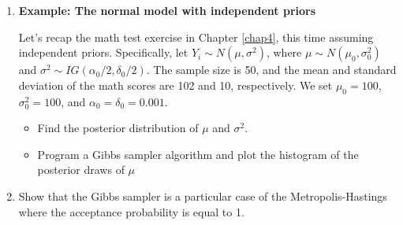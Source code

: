 \begin{enumerate}
	\item \textbf{Example: The normal model with independent priors}
	
	Let's recap the math test exercise in Chapter \ref{chap4}, this time assuming independent priors. Specifically, let $Y_i \sim N(\mu, \sigma^2)$, where $\mu \sim N(\mu_0, \sigma_0^2)$ and $\sigma^2 \sim IG(\alpha_0 / 2, \delta_0 / 2)$. The sample size is 50, and the mean and standard deviation of the math scores are 102 and 10, respectively. We set $\mu_0 = 100$, $\sigma_0^2 = 100$, and $\alpha_0 = \delta_0 = 0.001$.
	
	\begin{itemize}
		\item Find the posterior distribution of $\mu$ and $\sigma^2$.
		\item Program a Gibbs sampler algorithm and plot the histogram of the posterior draws of $\mu$
	\end{itemize}

	\item Show that the Gibbs sampler is a particular case of the Metropolis-Hastings where the acceptance probability is equal to 1. 
	
\end{enumerate}



